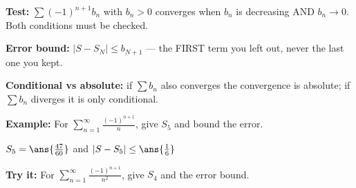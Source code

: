 \documentclass[12pt]{article}
\begin{document}

\begin{formulabox}
\textbf{Test:} $\sum(-1)^{n+1}b_{n}$ with $b_{n}>0$ converges when $b_{n}$ is decreasing AND $b_{n}\to 0$. Both conditions must be checked.\par
\textbf{Error bound:} $|S-S_{N}|\le b_{N+1}$ --- the FIRST term you left out, never the last one you kept.\par
\textbf{Conditional vs absolute:} if $\sum b_{n}$ also converges the convergence is absolute; if $\sum b_{n}$ diverges it is only conditional.
\end{formulabox}

\begin{examplebox}
\textbf{Example:} \quad For $\displaystyle\sum_{n=1}^{\infty}\frac{(-1)^{n+1}}{n}$, give $S_{5}$ and bound the error.

$S_{5} = \ans{\tfrac{47}{60}}$ \quad and \quad $|S-S_{5}| \le \ans{\tfrac{1}{6}}$
\end{examplebox}

\begin{tryitbox}
\textbf{Try it:} \quad For $\displaystyle\sum_{n=1}^{\infty}\frac{(-1)^{n+1}}{n^{2}}$, give $S_{4}$ and the error bound.\\[2pt]
\end{tryitbox}
\end{document}
